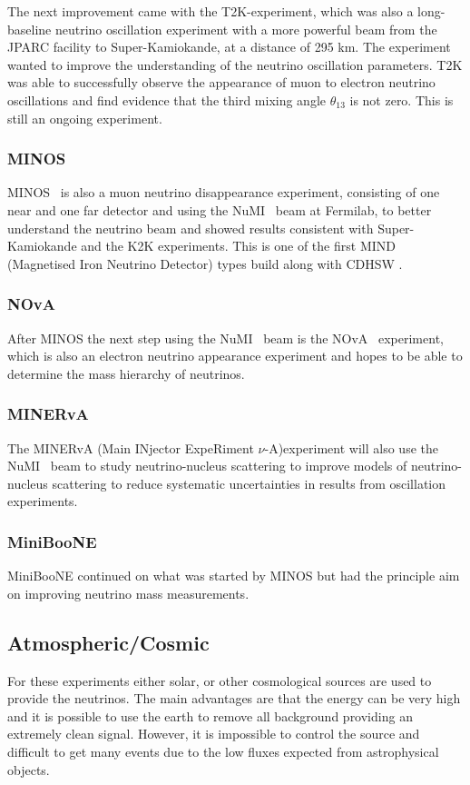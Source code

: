 The next improvement came with the T2K-experiment\cite{21T2K}, which was also a long-baseline neutrino oscillation experiment with a more powerful beam from the JPARC facility to Super-Kamiokande, at a distance of 295 km. The experiment wanted to improve the understanding of the neutrino oscillation parameters. T2K was able to successfully observe the appearance of muon to electron neutrino oscillations and find evidence that the third mixing angle $\theta_{13}$ is not zero. This is still an ongoing experiment.

\subsubsection{MINOS}
MINOS~\cite{MINOS} is also a muon neutrino disappearance experiment, consisting of one near and one far detector and using the NuMI~\cite{19NuMI} beam at Fermilab, to better understand the neutrino beam and showed results consistent with Super-Kamiokande and the K2K experiments. This is one of the first MIND (Magnetised Iron Neutrino Detector) types build along with CDHSW \cite{40CDHSW}.

\subsubsection{NOvA}
After MINOS the next step using the NuMI~\cite{19NuMI} beam is the NOvA~\cite{18nova} experiment, which is also an electron neutrino appearance experiment and hopes to be able to determine the mass hierarchy of neutrinos.

\subsubsection{MINERvA}
The MINERvA (Main INjector ExpeRiment $\nu$-A)experiment \cite{39minerva} will also use the NuMI~\cite{19NuMI} beam to study neutrino-nucleus scattering to improve models of neutrino-nucleus scattering to reduce systematic uncertainties in results from oscillation experiments.

\subsubsection{MiniBooNE}
MiniBooNE\cite{41MiniBooNE} continued on what was started by MINOS but had the principle aim on improving neutrino mass measurements.

\subsection{Atmospheric/Cosmic}
For these experiments either solar, or other cosmological sources are used to provide the neutrinos. The main advantages are that the energy can be very high and it is possible to use the earth to remove all background providing an extremely clean signal.
However, it is impossible to control the source and difficult to get many events due to the low fluxes expected from astrophysical objects.

